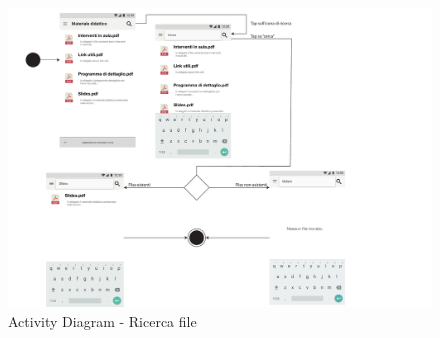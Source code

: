 \begin{figure}
	\centering
	\includegraphics[width=6in]{imgs/gruppo1/activity_diagrams/AD14_ricerca_file.pdf}
	\caption{Activity Diagram - Ricerca file}
	\label{diag:ricercaFileAD}
\end{figure}
\newpage

